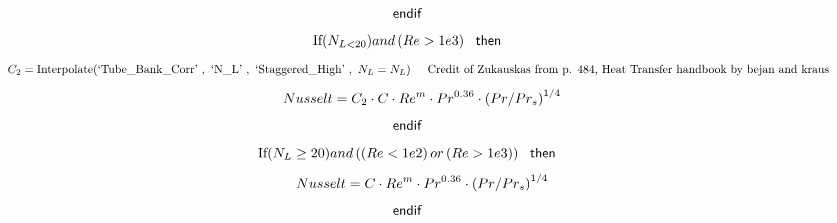 \documentclass[10pt,fleqn]{article}
\newcommand{\K}[1]{\mbox{\sf#1\ \ \mit}}
\newcommand{\KS}[1]{\mbox{\sf\ \ #1\ \ \mit}}
\newcommand{\SC}[1]{\mbox{`#1'}\  }
\newcommand{\V}[1]{\mbox{$ #1 $}}
\newcommand{\I}{\mbox{\hspace{0.20in}}}
\begin{document}
\begin{equation}
\I \label{EES Eqn:282}
\K{endif}	 
\end{equation}
\begin{equation}
\I \label{EES Eqn:283}
\mbox{If}{ \left( N_{L<20} \right) } \V{and}   \left( \V{Re>1e3}  \right)  \KS{then}	 
\end{equation}
\begin{equation}
\I \I \label{EES Eqn:284}
C_{2}=\mbox{Interpolate}{ \left( \SC{Tube\_Bank\_Corr},\ \SC{N\_L},\ \SC{Staggered\_High},\ N_{L}=N_{L} \right) }	 
\mbox{\I Credit of Zukauskas from p. 484, Heat Transfer handbook by bejan and kraus}
\end{equation}
\begin{equation}
\I \I \label{EES Eqn:285}
\V{Nusselt} =C_{2}\cdot C\cdot \V{Re} ^{m}\cdot \V{Pr} ^{0.36}\cdot  \left( \V{Pr}/Pr_{s} \right) ^{1/4} 
\end{equation}
\begin{equation}
\I \label{EES Eqn:286}
\K{endif} 
\end{equation}
\begin{equation}
\I \label{EES Eqn:287}
\mbox{If}{ \left( N_{L}\geq 20 \right) } \V{and}   \left(  \left( \V{Re<1e2}  \right)  \V{or}   \left( \V{Re>1e3}  \right)  \right)  \KS{then} 
\end{equation}
\begin{equation}
\I \I \label{EES Eqn:288}
\V{Nusselt} =C\cdot \V{Re} ^{m}\cdot \V{Pr} ^{0.36}\cdot  \left( \V{Pr}/Pr_{s} \right) ^{1/4} 
\end{equation}
\begin{equation}
\I \label{EES Eqn:289}
\K{endif} 
\end{equation}
\end{document}
